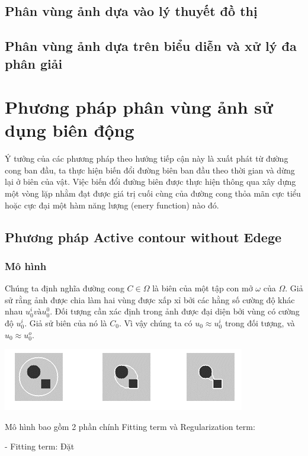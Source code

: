 \documentclass[12pt,oneside,a4]{report}
\begin{document}
\section{Phân vùng ảnh dựa vào lý thuyết đồ thị}
\section{Phân vùng ảnh dựa trên biểu diễn và xử lý đa phân giải}
\chapter{Phương pháp phân vùng ảnh sử dụng biên động}
Ý tưởng của các phương pháp theo hướng tiếp cận này là xuất phát từ đường cong ban đầu, ta thực hiện biến đổi đường biên ban đầu theo thời gian  và dừng lại ở biên của vật. Việc biến đổi đường biên được thực hiện thông qua xây dựng một vòng lặp nhằm đạt được giá trị cuối cùng của đường cong thỏa mãn cực tiểu hoặc cực đại một hàm năng lượng (enery function) nào đó.
\section{Phương pháp Active contour without Edege}


\subsection{Mô hình}
Chúng ta định nghĩa đường cong $C\in \Omega$ là biên của một tập con mở $\omega$ của $\Omega$. Giả sử rằng ảnh được chia làm hai vùng được xấp xỉ bởi các hằng số cường độ khác nhau $u_0^i và u_0^0$. Đối tượng cần xác định trong ảnh được đại diện bởi vùng có cường độ $u_0^i$. Giả sử biên của nó là $C_0$. Vì vậy chúng ta có $u_0\approx u_0^i$ trong đối tượng, và $u_0\approx u_0^o$.
\begin{center}
\includegraphics[scale=1]{figure/ytuong.png}
\end{center}
Mô hình bao gồm 2 phần chính Fitting term và Regularization term: 

- Fitting term: Đặt
\end{document}
